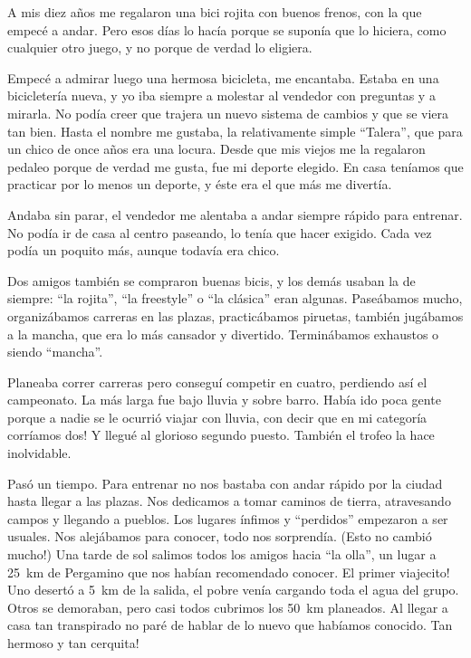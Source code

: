\documentclass[11pt]{book}
\begin{document}
A mis diez a\~nos me regalaron una bici rojita con buenos frenos, con la que
empec\'e a andar. Pero esos d\'ias lo hac\'ia porque se supon\'ia que lo
hiciera, como cualquier otro juego, y no porque de verdad lo eligiera.

Empec\'e a admirar luego una hermosa bicicleta, me encantaba. Estaba en una
bicicleter\'ia nueva, y yo iba siempre a molestar al vendedor con preguntas y
a mirarla. No pod\'ia creer que trajera un nuevo sistema de cambios y que se
viera tan bien. Hasta el nombre me gustaba, la relativamente simple
``Talera'', que para un chico de once a\~nos era una locura. Desde que mis
viejos me la regalaron pedaleo porque de verdad me gusta, fue mi deporte
elegido. En casa ten\'iamos que practicar por lo menos un deporte, y \'este
era el que m\'as me divert\'ia.

Andaba sin parar, el vendedor me alentaba a andar siempre r\'apido para
entrenar. No pod\'ia ir de casa al centro paseando, lo ten\'ia que hacer
exigido. Cada vez pod\'ia un poquito m\'as, aunque todav\'ia era chico.

Dos amigos tambi\'en se compraron buenas bicis, y los dem\'as usaban la de
siempre: ``la rojita'', ``la freestyle'' o ``la cl\'asica'' eran algunas.
Pase\'abamos mucho, organiz\'abamos carreras en las plazas, practic\'abamos
piruetas, tambi\'en jug\'abamos a la mancha, que era lo m\'as cansador y
divertido. Termin\'abamos exhaustos o siendo ``mancha''.

Planeaba correr carreras pero consegu\'i competir en cuatro, perdiendo as\'i
el campeonato. La m\'as larga fue bajo lluvia y sobre barro. Hab\'ia ido poca
gente porque a nadie se le ocurri\'o viajar con lluvia, \textexclamdown con
decir que en mi categor\'ia corr\'iamos dos! Y llegu\'e al glorioso segundo
puesto. Tambi\'en el trofeo la hace inolvidable.

Pas\'o un tiempo. Para entrenar no nos bastaba con andar r\'apido por la ciudad
hasta llegar a las plazas. Nos dedicamos a tomar caminos de tierra, atravesando
campos y llegando a pueblos. Los lugares \'infimos y ``perdidos'' empezaron a
ser usuales. Nos alej\'abamos para conocer, todo nos sorprend\'ia.
(\textexclamdown Esto no cambi\'o mucho!) Una tarde de sol salimos todos los
amigos hacia ``la olla'', un lugar a 25~km de Pergamino que nos hab\'ian
recomendado conocer. \textexclamdown El primer viajecito! Uno desert\'o a 5~km
de la salida, el pobre ven\'ia cargando toda el agua del grupo. Otros se
demoraban, pero casi todos cubrimos los 50~km planeados. Al llegar a casa tan
transpirado no par\'e de hablar de lo nuevo que hab\'iamos conocido.
\textexclamdown Tan hermoso y tan cerquita!
\end{document}
